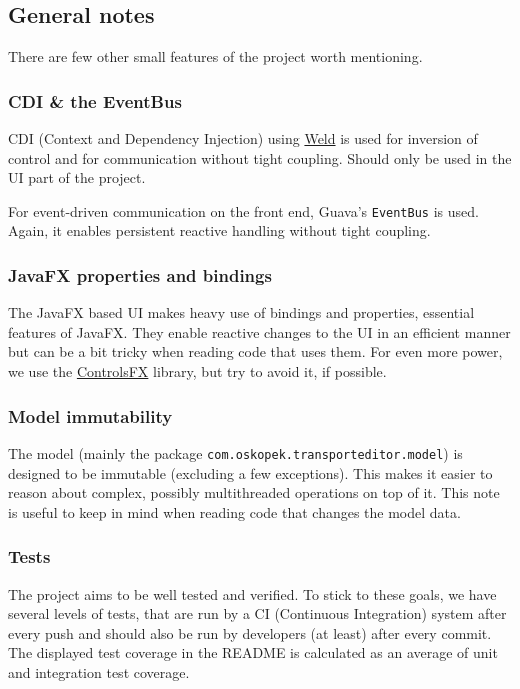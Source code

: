 \subsection*{General notes}
There are few other small features of the project worth mentioning.

\subsubsection*{CDI \& the EventBus}
CDI (Context and Dependency Injection) using \href{http://weld.cdi-spec.org/}{Weld} is used for inversion of control
and for communication without tight coupling. Should only be used in the UI part of the project.

For event-driven communication on the front end, Guava's \texttt{EventBus} is used. Again, it enables persistent
reactive handling without tight coupling.

\subsubsection*{JavaFX properties and bindings}
The JavaFX based UI makes heavy use of bindings and properties, essential features of JavaFX. They enable
reactive changes to the UI in an efficient manner but can be a bit tricky when reading code that uses them.
For even more power, we use the \href{http://fxexperience.com/controlsfx/}{ControlsFX} library, but try to avoid it,
if possible.

\subsubsection*{Model immutability}
The model (mainly the package \texttt{com.oskopek.transporteditor.model}) is designed to be immutable
(excluding a few exceptions). This makes it easier to reason about complex, possibly multithreaded operations
on top of it. This note is useful to keep in mind when reading code that changes the model data.

\subsubsection*{Tests}
The project aims to be well tested and verified. To stick to these goals, we have several levels of tests,
that are run by a CI (Continuous Integration) system after every push and should also be run by developers
(at least) after every commit. The displayed test coverage in the README is calculated as an average of unit
and integration test coverage.

